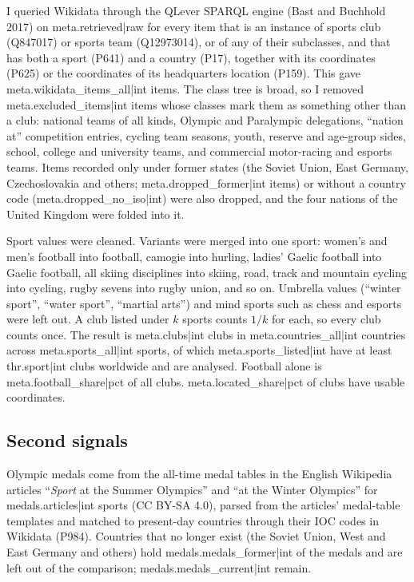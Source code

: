 \documentclass[11pt,a4paper]{article}
\begin{document}
I queried Wikidata through the QLever SPARQL engine (Bast and Buchhold 2017) on {{meta.retrieved|raw}} for every item that is an instance of sports club (Q847017) or sports team (Q12973014), or of any of their subclasses, and that has both a sport (P641) and a country (P17), together with its coordinates (P625) or the coordinates of its headquarters location (P159). This gave {{meta.wikidata_items_all|int}} items. The class tree is broad, so I removed {{meta.excluded_items|int}} items whose classes mark them as something other than a club: national teams of all kinds, Olympic and Paralympic delegations, ``nation at'' competition entries, cycling team seasons, youth, reserve and age-group sides, school, college and university teams, and commercial motor-racing and esports teams. Items recorded only under former states (the Soviet Union, East Germany, Czechoslovakia and others; {{meta.dropped_former|int}} items) or without a country code ({{meta.dropped_no_iso|int}}) were also dropped, and the four nations of the United Kingdom were folded into it.

Sport values were cleaned. Variants were merged into one sport: women's and men's football into football, camogie into hurling, ladies' Gaelic football into Gaelic football, all skiing disciplines into skiing, road, track and mountain cycling into cycling, rugby sevens into rugby union, and so on. Umbrella values (``winter sport'', ``water sport'', ``martial arts'') and mind sports such as chess and esports were left out. A club listed under $k$ sports counts $1/k$ for each, so every club counts once. The result is {{meta.clubs|int}} clubs in {{meta.countries_all|int}} countries across {{meta.sports_all|int}} sports, of which {{meta.sports_listed|int}} have at least {{thr.sport|int}} clubs worldwide and are analysed. Football alone is {{meta.football_share|pct}} of all clubs. {{meta.located_share|pct}} of clubs have usable coordinates.

\subsection{Second signals}

Olympic medals come from the all-time medal tables in the English Wikipedia articles ``\emph{Sport} at the Summer Olympics'' and ``at the Winter Olympics'' for {{medals.articles|int}} sports (CC BY-SA 4.0), parsed from the articles' medal-table templates and matched to present-day countries through their IOC codes in Wikidata (P984). Countries that no longer exist (the Soviet Union, West and East Germany and others) hold {{medals.medals_former|int}} of the medals and are left out of the comparison; {{medals.medals_current|int}} remain.
\end{document}

